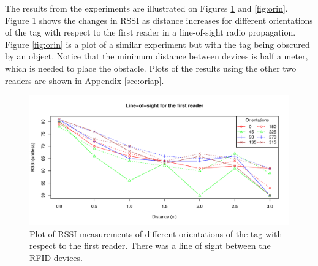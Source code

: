 The results from the experiments are illustrated on Figures \ref{fig:oril} and \ref{fig:orin}. Figure \ref{fig:oril} shows the changes in RSSI as distance increases for different orientations of the tag with respect to the first reader in a line-of-sight radio propagation. Figure \ref{fig:orin} is a plot of a similar experiment but with the tag being obscured by an object. Notice that the minimum distance between devices is half a meter, which is needed to place the obstacle. Plots of the results using the other two readers are shown in Appendix \ref{sec:oriap}.
\begin{figure}[H]
	\begin{center}
		\includegraphics[width=1\textwidth]{figures/rssi_distance_3m_los_r1}
		\caption{Plot of RSSI measurements of different orientations of the tag with respect to the first reader. There was  a line of sight between the RFID devices.}
		\label{fig:oril}
	\end{center}
\end{figure}

